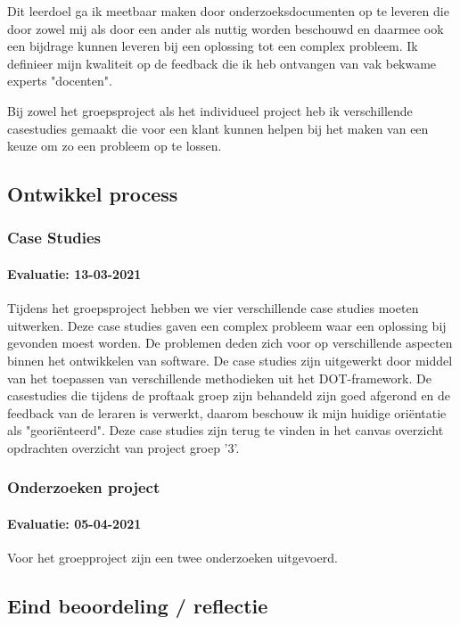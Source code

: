 Dit leerdoel ga ik meetbaar maken door onderzoeksdocumenten op te leveren die door zowel mij als door een ander als
nuttig worden beschouwd en daarmee ook een bijdrage kunnen leveren bij een oplossing tot een complex probleem.
Ik definieer mijn kwaliteit op de feedback die ik heb ontvangen van vak bekwame experts "docenten".

Bij zowel het groepsproject als het individueel project heb ik verschillende casestudies gemaakt die voor een klant
kunnen helpen bij het maken van een keuze om zo een probleem op te lossen.

\bigskip
\subsection{Ontwikkel process}
\subsubsection{Case Studies}
\paragraph{Evaluatie: 13-03-2021}
Tijdens het groepsproject hebben we vier verschillende case studies moeten uitwerken.
Deze case studies gaven een complex probleem waar een oplossing bij gevonden moest worden.
De problemen deden zich voor op verschillende aspecten binnen het ontwikkelen van software.
De case studies zijn uitgewerkt door middel van het toepassen van verschillende methodieken uit het DOT-framework.
De casestudies die tijdens de proftaak groep zijn behandeld zijn goed afgerond en de feedback van de leraren is
verwerkt, daarom beschouw ik mijn huidige oriëntatie als "georiënteerd".
Deze case studies zijn terug te vinden in het canvas overzicht opdrachten overzicht van project groep '3'.

\subsubsection{Onderzoeken project}
\paragraph{Evaluatie: 05-04-2021}
Voor het groepproject zijn een twee onderzoeken uitgevoerd.

\subsection{Eind beoordeling / reflectie}










